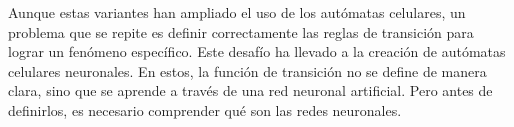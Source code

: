 Aunque estas variantes han ampliado el uso de los autómatas celulares, un problema que se repite es definir correctamente las reglas de transición para lograr un fenómeno específico. Este desafío ha llevado a la creación de autómatas celulares neuronales. En estos, la función de transición no se define de manera clara, sino que se aprende a través de una red neuronal artificial. Pero antes de definirlos, es necesario comprender qué son las redes neuronales.

\clearpage